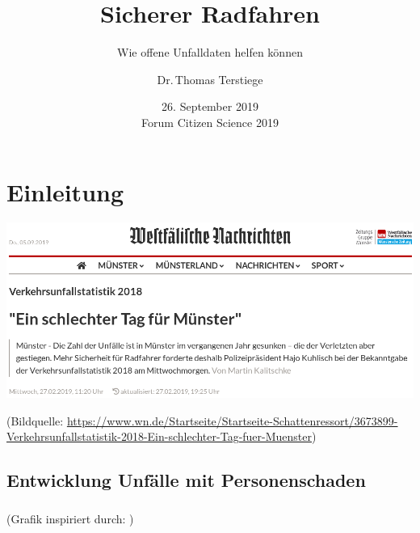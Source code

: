 \documentclass{beamer}
\title[Sicherer Radfahren \hspace*{4cm} \insertframenumber/\inserttotalframenumber]{Sicherer Radfahren}
\subtitle{Wie offene Unfalldaten helfen können}
\author[Dr.\,Thomas Terstiege]{Dr.\,Thomas Terstiege}
\institute[Code for Münster]{Code for Münster}
\date{26. September 2019\\{\scriptsize{}Forum Citizen Science 2019 }}%
\begin{document}

\section{Einleitung}

\begin{frame}
  
  \includegraphics[width=\textwidth]{img/WN-screenshot.png}
  
  \vfill
  {\scriptsize (Bildquelle: \url{https://www.wn.de/Startseite/Startseite-Schattenressort/3673899-Verkehrsunfallstatistik-2018-Ein-schlechter-Tag-fuer-Muenster})\par}
\end{frame}

\subsection{Entwicklung Unfälle mit Personenschaden}

\begin{frame}
  \frametitle{\subsecname}

  \centering
  
  \resizebox{\linewidth}{!}{
    
    }
  
    {\scriptsize (Grafik inspiriert durch: \cite[Folie~4]{Brockmann2017})\par}
\end{frame}
\end{document}
